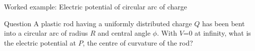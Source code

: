 %
%

{
\problemslide

%
%
%

\begin{frame}{Worked example: Electric potential of circular arc of charge}

\begin{blockexmplque}{Question}
A plastic rod having a uniformly distributed charge $Q$ has been bent
into a circular arc of radius $R$ and central angle $\phi$.
With $V$=0 at infinity, what is the electric potential at $P$, the centre of
curvature of the rod?
\end{blockexmplque}

\vspace{0.2cm}


\end{frame}}
